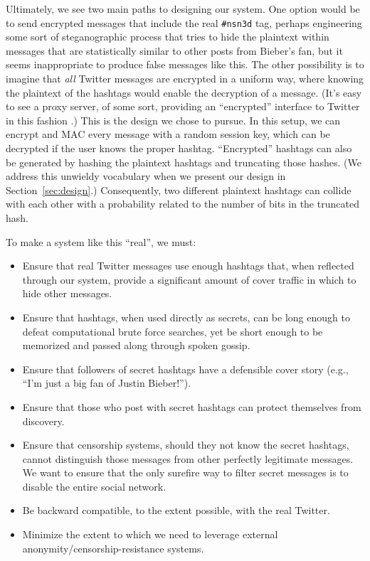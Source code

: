 \documentclass{sig-alternate-arxiv}
\newcommand{\hlfixme}[1]{\fixme{\hl{#1}}}
\begin{document}
Ultimately, we see two main paths to designing our system. One option would be to send encrypted messages that include the real {\tt \#nsn3d} tag, perhaps engineering some sort of steganographic process that tries to hide the plaintext within messages that are statistically similar to other posts from Bieber's fan, but it seems inappropriate to produce false messages like this. The other possibility is to imagine that {\em all} Twitter messages are encrypted in a uniform way, where knowing the plaintext of the hashtags would enable the decryption of a message. (It's easy to see a proxy server, of some sort, providing an ``encrypted'' interface to Twitter in this fashion%
.) This is the design we chose to pursue. In this setup, we can encrypt and MAC every message with a random session key, which can be decrypted if the user knows the proper hashtag. ``Encrypted'' hashtags can also be generated by hashing the plaintext hashtags and truncating those hashes.  (We address this unwieldy vocabulary when we present our design in Section~\ref{sec:design}.) Consequently, two different plaintext hashtags can collide with each other with a probability related to the number of bits in the truncated hash.

To make a system like this ``real'', we must:
\begin{itemize}
\item Ensure that real Twitter messages use enough hashtags that, when reflected through our system, provide a significant amount of cover traffic in which to hide other messages.
\item Ensure that hashtags, when used directly as secrets, can be long enough to defeat computational brute force searches, yet be short enough to be memorized and passed along through spoken gossip.
\item Ensure that followers of secret hashtags have a defensible cover story (e.g., ``I'm just a big fan of Justin Bieber!'').
\item Ensure that those who post with secret hashtags can protect themselves from discovery.
\item Ensure that censorship systems, should they not know the secret hashtags, cannot distinguish those messages from other perfectly legitimate messages. We want to ensure that the only surefire way to filter secret messages is to disable the entire social network.
\item Be backward compatible, to the extent possible, with the real Twitter.
\item Minimize the extent to which we need to leverage external anonymity/censorship-resistance systems.
\end{itemize}
\fi
\end{document}
